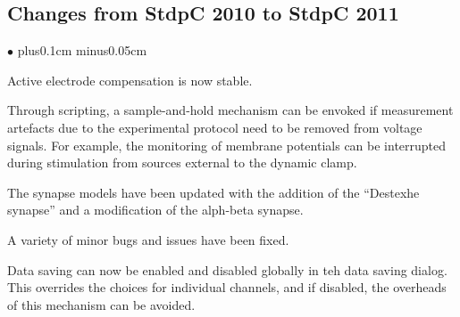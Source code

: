 \documentclass{article}
\newenvironment{myitem}{\begin{list}{$\bullet$}{\setlength{\leftmargin}{1.1em}
\itemsep0.1cm plus0.1cm minus0.05cm
\listparindent0cm
\addtolength{\labelsep}{0.5\labelsep}
\setlength{\labelwidth}{0.8em}
\setlength{\leftmargin}{\labelwidth}
\addtolength{\leftmargin}{\labelsep}
}}{\end{list}}
\begin{document}
\subsection{Changes from StdpC 2010 to StdpC 2011}
\begin{myitem}
\item Active electrode compensation is now stable.
\item Through scripting, a sample-and-hold mechanism can be envoked if
  measurement artefacts due to the experimental protocol need to be
  removed from voltage signals. For example, the monitoring of
  membrane potentials can be interrupted during stimulation from
  sources external to the dynamic clamp.
\item The synapse models have been updated with the addition of the
  ``Destexhe synapse'' and a modification of the alph-beta synapse.
\item A variety of minor bugs and issues have been fixed.
\item Data saving can now be enabled and disabled globally in teh data
  saving dialog. This overrides the choices for individual channels,
  and if disabled, the overheads of this mechanism can be avoided.
\end{myitem}
\end{document}
